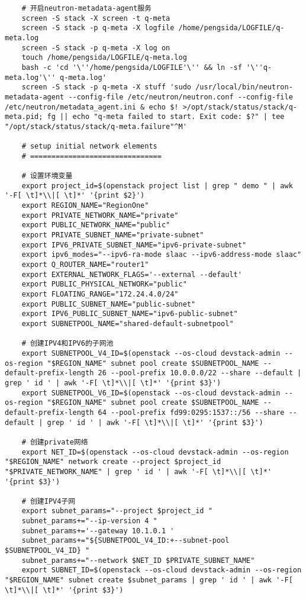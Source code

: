 \documentclass[a4paper,left=1.5cm,right=1.5cm,11pt]{article}
\begin{document}
\begin{lstlisting}
	# 开启neutron-metadata-agent服务
	screen -S stack -X screen -t q-meta
	screen -S stack -p q-meta -X logfile /home/pengsida/LOGFILE/q-meta.log
    screen -S stack -p q-meta -X log on
	touch /home/pengsida/LOGFILE/q-meta.log
    bash -c 'cd '\''/home/pengsida/LOGFILE'\'' && ln -sf '\''q-meta.log'\'' q-meta.log'
	screen -S stack -p q-meta -X stuff 'sudo /usr/local/bin/neutron-metadata-agent --config-file /etc/neutron/neutron.conf --config-file /etc/neutron/metadata_agent.ini & echo $! >/opt/stack/status/stack/q-meta.pid; fg || echo "q-meta failed to start. Exit code: $?" | tee "/opt/stack/status/stack/q-meta.failure"^M'

	# setup initial network elements
	# ===============================

	# 设置环境变量
	export project_id=$(openstack project list | grep " demo " | awk '-F[ \t]*\\|[ \t]*' '{print $2}')
	export REGION_NAME="RegionOne"
	export PRIVATE_NETWORK_NAME="private"
	export PUBLIC_NETWORK_NAME="public"
	export PRIVATE_SUBNET_NAME="private-subnet"
	export IPV6_PRIVATE_SUBNET_NAME="ipv6-private-subnet"
	export ipv6_modes="--ipv6-ra-mode slaac --ipv6-address-mode slaac"
	export Q_ROUTER_NAME="router1"
	export EXTERNAL_NETWORK_FLAGS='--external --default'
	export PUBLIC_PHYSICAL_NETWORK="public"
	export FLOATING_RANGE="172.24.4.0/24"
	export PUBLIC_SUBNET_NAME="public-subnet"
	export IPV6_PUBLIC_SUBNET_NAME="ipv6-public-subnet"
	export SUBNETPOOL_NAME="shared-default-subnetpool"

	# 创建IPV4和IPV6的子网池
	export SUBNETPOOL_V4_ID=$(openstack --os-cloud devstack-admin --os-region "$REGION_NAME" subnet pool create $SUBNETPOOL_NAME --default-prefix-length 26 --pool-prefix 10.0.0.0/22 --share --default | grep ' id ' | awk '-F[ \t]*\\|[ \t]*' '{print $3}')
	export SUBNETPOOL_V6_ID=$(openstack --os-cloud devstack-admin --os-region "$REGION_NAME" subnet pool create $SUBNETPOOL_NAME --default-prefix-length 64 --pool-prefix fd99:0295:1537::/56 --share --default | grep ' id ' | awk '-F[ \t]*\\|[ \t]*' '{print $3}')

	# 创建private网络
	export NET_ID=$(openstack --os-cloud devstack-admin --os-region "$REGION_NAME" network create --project $project_id "$PRIVATE_NETWORK_NAME" | grep ' id ' | awk '-F[ \t]*\\|[ \t]*' '{print $3}')
	
	# 创建IPV4子网
	export subnet_params="--project $project_id "
	subnet_params+="--ip-version 4 "
	subnet_params+='--gateway 10.1.0.1 '
	subnet_params+="${SUBNETPOOL_V4_ID:+--subnet-pool $SUBNETPOOL_V4_ID} "
    subnet_params+="--network $NET_ID $PRIVATE_SUBNET_NAME"
	export SUBNET_ID=$(openstack --os-cloud devstack-admin --os-region "$REGION_NAME" subnet create $subnet_params | grep ' id ' | awk '-F[ \t]*\\|[ \t]*' '{print $3}')


\end{lstlisting}
\end{document}

